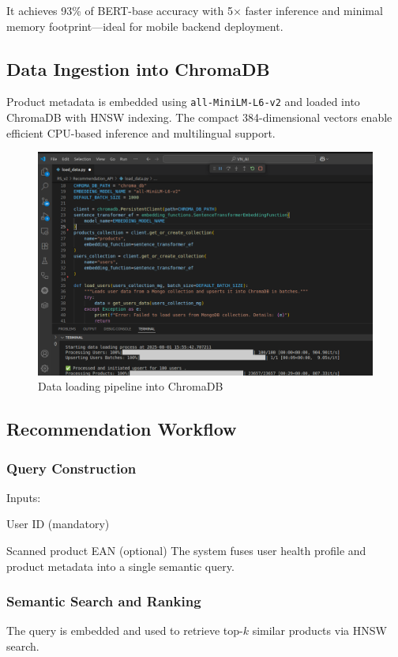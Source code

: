 It achieves 93\% of BERT-base accuracy with 5× faster inference and minimal memory footprint—ideal for mobile backend deployment.

\subsection{Data Ingestion into ChromaDB}
Product metadata is embedded using \texttt{all-MiniLM-L6-v2} and loaded into ChromaDB with HNSW indexing. The compact 384-dimensional vectors enable efficient CPU-based inference and multilingual support.

\begin{figure}[H]
\centering
\includegraphics[scale=0.39]{images/load_data__0.png}
\caption{Data loading pipeline into ChromaDB}
\label{fig:load_data_chroma}
\end{figure}

\subsection{Recommendation Workflow}
\subsubsection{Query Construction}
Inputs:
\item User ID (mandatory)
    \item Scanned product EAN (optional)
The system fuses user health profile and product metadata into a single semantic query.

\subsubsection{Semantic Search and Ranking}
The query is embedded and used to retrieve top-\(k\) similar products via HNSW search.

